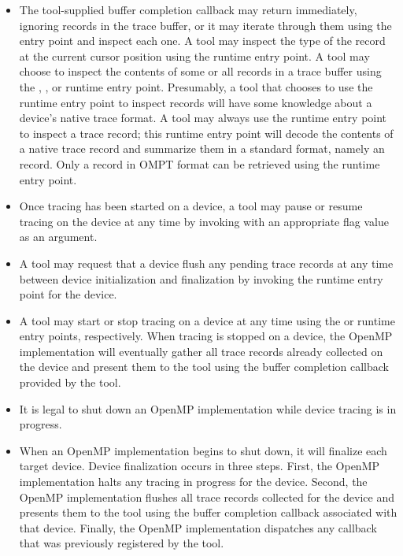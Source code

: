 \begin{itemize}
\item The tool-supplied buffer completion callback may return
  immediately, ignoring records in the trace buffer, or it may iterate
  through them using the  entry
  point
  and inspect each one. A tool may inspect the type of the record at
  the current cursor position using the 
  runtime entry point.  A tool may choose to inspect the contents of some or
  all records in a trace buffer using the ,
  , or
   runtime entry point.  Presumably, a tool that
  chooses to use the  runtime entry point to
  inspect records will have some knowledge about a device's native
  trace format.  A tool may always use the
   runtime entry point to inspect a trace
  record; this runtime entry point will decode the contents of a native trace record
  and summarize them in a standard format, namely an
   record.
  Only a record in OMPT format can be retrieved using the
   runtime entry point.
\item Once tracing has been started on a device, a tool may pause or resume
  tracing on the device at any time by invoking
   with an appropriate flag value as an
  argument.
\item A tool may request that a device flush any pending trace records
  at any time between device initialization and finalization
  by invoking the  runtime entry point for the device.
\item A tool may start or stop tracing on a device at any time using the
   or  runtime entry points,
  respectively. When tracing is stopped on a device, the OpenMP implementation will eventually
  gather all trace records already collected on the device and present them to the tool using
  the buffer completion callback provided by the tool.
\item It is legal to shut down an OpenMP implementation while device tracing
is in progress.
\item When an OpenMP implementation begins to shut down, it will
  finalize each target device.  Device finalization occurs in three steps.
  First, the OpenMP implementation halts any tracing in progress for the device. Second,
  the OpenMP implementation flushes all trace records collected for the device and presents them to
  the tool using the buffer completion callback associated with that device.
  Finally, the OpenMP implementation dispatches
  any  callback that was previously
  registered by the tool.

\end{itemize}


